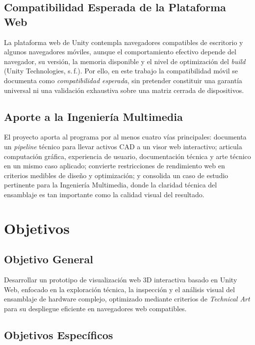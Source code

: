 \subsection{Compatibilidad Esperada de la Plataforma Web}

La plataforma web de Unity contempla navegadores compatibles de escritorio y algunos navegadores móviles, aunque el comportamiento efectivo depende del navegador, su versión, la memoria disponible y el nivel de optimización del \textit{build} (Unity Technologies, s.\,f.). Por ello, en este trabajo la compatibilidad móvil se documenta como \textit{compatibilidad esperada}, sin pretender constituir una garantía universal ni una validación exhaustiva sobre una matriz cerrada de dispositivos.

\subsection{Aporte a la Ingeniería Multimedia}

El proyecto aporta al programa por al menos cuatro vías principales: documenta un \textit{pipeline} técnico para llevar activos CAD a un visor web interactivo; articula computación gráfica, experiencia de usuario, documentación técnica y arte técnico en un mismo caso aplicado; convierte restricciones de rendimiento web en criterios medibles de diseño y optimización; y consolida un caso de estudio pertinente para la Ingeniería Multimedia, donde la claridad técnica del ensamblaje es tan importante como la calidad visual del resultado.

\section{Objetivos}

\subsection{Objetivo General}

Desarrollar un prototipo de visualización web 3D interactiva basado en Unity Web, enfocado en la exploración técnica, la inspección y el análisis visual del ensamblaje de hardware complejo, optimizado mediante criterios de \textit{Technical Art} para su despliegue eficiente en navegadores web compatibles.

\subsection{Objetivos Específicos}

